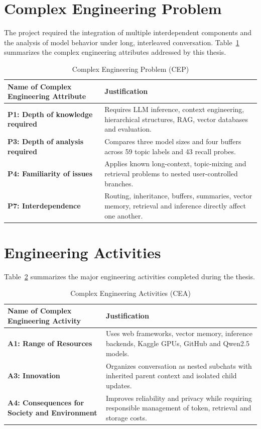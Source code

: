 \section{Complex Engineering Problem}
The project required the integration of multiple interdependent components and the analysis of model behavior under long, interleaved conversation. Table~\ref{table_OBE1} summarizes the complex engineering attributes addressed by this thesis.

\begin{table}[H]
\centering
\caption{Complex Engineering Problem (CEP)}
\begin{tabular}{p{.27\linewidth} p{.67\linewidth}}
\hline
Name of Complex Engineering Attribute & Justification \\ \hline
\textbf{P1: Depth of knowledge required} & Requires LLM inference, context engineering, hierarchical structures, RAG, vector databases and evaluation. \\
\textbf{P3: Depth of analysis required} & Compares three model sizes and four buffers across 59 topic labels and 43 recall probes. \\
\textbf{P4: Familiarity of issues} & Applies known long-context, topic-mixing and retrieval problems to nested user-controlled branches. \\
\textbf{P7: Interdependence} & Routing, inheritance, buffers, summaries, vector memory, retrieval and inference directly affect one another. \\
\hline
\end{tabular}
\label{table_OBE1}
\end{table}

\section{Engineering Activities}
Table~\ref{table_OBE2} summarizes the major engineering activities completed during the thesis.

\begin{table}[H]
\centering
\caption{Complex Engineering Activities (CEA)}
\begin{tabular}{p{.27\linewidth} p{.67\linewidth}}
\hline
Name of Complex Engineering Activity & Justification \\ \hline
\textbf{A1: Range of Resources} & Uses web frameworks, vector memory, inference backends, Kaggle GPUs, GitHub and Qwen2.5 models. \\
\textbf{A3: Innovation} & Organizes conversation as nested subchats with inherited parent context and isolated child updates. \\
\textbf{A4: Consequences for Society and Environment} & Improves reliability and privacy while requiring responsible management of token, retrieval and storage costs. \\
\hline
\end{tabular}
\label{table_OBE2}
\end{table}

